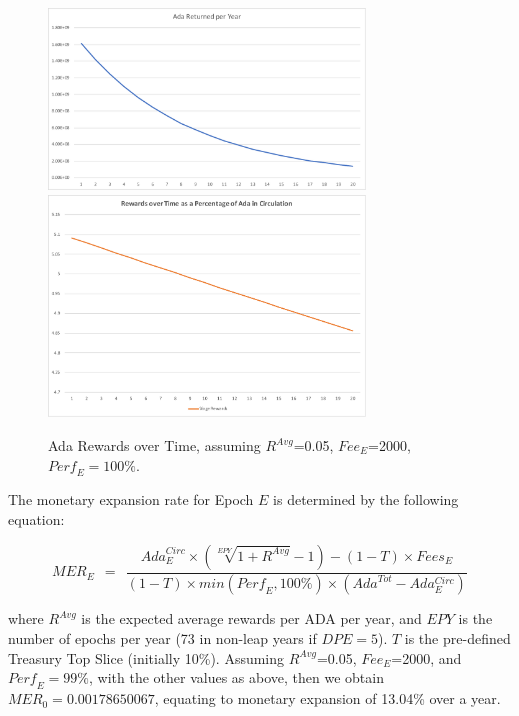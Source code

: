 \documentclass[11pt,a4paper,dvipsnames,twosided,final]{article}
\newcommand{\ada}{ADA{}}
\begin{document}
\begin{figure}[h!]
  \begin{center}
    \includegraphics[width=0.75\textwidth]{AdaPerYear.pdf}
\\[2ex]
    \includegraphics[width=0.75\textwidth]{Rewards.pdf}
  \end{center}
  \caption{Ada Rewards over Time, assuming $R^{\textit{Avg}}$=0.05, $\textit{Fee}_E$=2000, $\textit{Perf}_E=100\%$.}
\end{figure}

\noindent
The monetary expansion rate for Epoch $E$ is determined by the following equation:

$$
\textit{MER}_E ~~=~~ \frac{\textit{Ada}^{Circ}_E \times (\sqrt[\textit{EPY}]{1+R^{\textit{Avg}}} - 1) - (1- T) \times \textit{Fees}_E}
                          {(1-T) \times \textit{min}(\textit{Perf}_E,100\%) \times (\textit{Ada}^{Tot} - Ada^{Circ}_E)}
$$

\noindent
where $R^{\textit{Avg}}$ is the expected average rewards per \ada{} per year, and $\textit{EPY}$ is the number of epochs per year (73 in non-leap years if
$\textit{DPE} = 5$). $T$ is the pre-defined Treasury Top Slice (initially 10\%).
%
Assuming $R^{\textit{Avg}}$=0.05, $\textit{Fee}_E$=2000, and $\textit{Perf}_E=99\%$, with the other values as above, then we obtain
$\textit{MER}_0 = 0.00178650067$, equating to monetary expansion of 13.04\% over a year.
\end{document}
